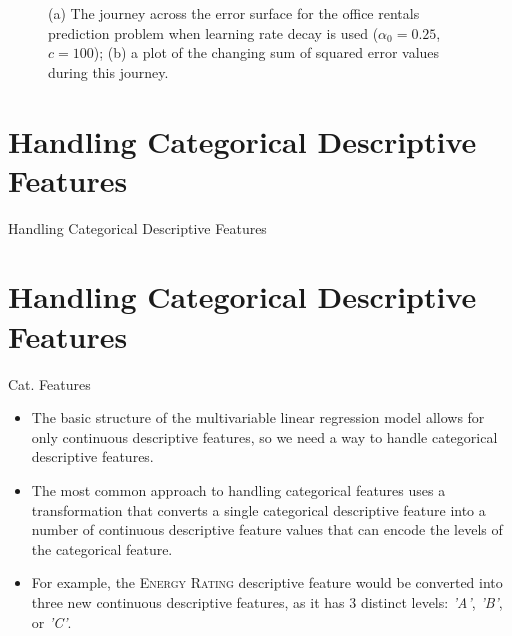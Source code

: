 \documentclass[xcolor={table}]{beamer}
\newcommand{\SectionSlideShortHeader}[3][]{
	\ifthenelse{\isempty{#1}}
		{\section[#3]{#2}\begin{frame} \begin{center}\begin{huge}#2\end{huge}\end{center}\end{frame}}
		{\section[#1]{#2}\begin{frame} \begin{center}\begin{huge}#3\end{huge}\end{center}\end{frame}}
}
\newcommand{\featN}[1]{\textsc{#1}}
\newcommand{\featL}[1]{\textit{'#1'}}
\begin{document}
 \begin{frame} 
\begin{figure}[!thb]
\begin{center}

\caption{(a) The journey across the error surface for the office rentals prediction problem when learning rate decay is used ($\alpha_0 = 0.25$, $c = 100$); (b) a plot of the changing sum of squared error values during this journey. }
\label{fig:learningRatesWithDecayExample2}
\end{center}
\end{figure}
\end{frame} 


\SectionSlideShortHeader{Handling Categorical Descriptive Features}{Cat. Features}

 \begin{frame} 
 \begin{itemize}
\item The basic structure of the multivariable linear regression model allows for only continuous descriptive features, so we need a way to handle categorical descriptive features. 
\item The most common approach to handling categorical features uses a transformation that converts a single categorical descriptive feature into a number of continuous descriptive feature values that can encode the levels of the categorical feature. 
\item For example, the \featN{Energy Rating} descriptive feature would be converted into three new continuous descriptive features, as it has 3 distinct levels: \featL{A}, \featL{B}, or \featL{C}. 
\end{itemize}
\end{frame} 
\end{document}

